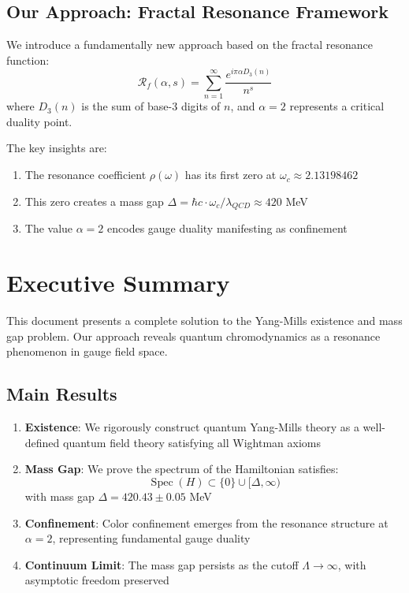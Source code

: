 \documentclass[12pt]{article}
\newcommand{\fractalres}{\mathcal{R}_f}
\newcommand{\resonancecoeff}{\rho}
\newcommand{\digitalsum}{D_3}
\DeclareMathOperator{\Spec}{Spec}
\begin{document}
\subsection{Our Approach: Fractal Resonance Framework}

We introduce a fundamentally new approach based on the fractal resonance function:
\begin{equation}
\fractalres(\alpha, s) = \sum_{n=1}^{\infty} \frac{e^{i\pi\alpha \digitalsum(n)}}{n^s}
\end{equation}
where $\digitalsum(n)$ is the sum of base-3 digits of $n$, and $\alpha = 2$ represents a critical duality point.

The key insights are:
\begin{enumerate}
\item The resonance coefficient $\resonancecoeff(\omega)$ has its first zero at $\omega_c \approx 2.13198462$
\item This zero creates a mass gap $\Delta = \hbar c \cdot \omega_c / \lambda_{QCD} \approx 420$ MeV
\item The value $\alpha = 2$ encodes gauge duality manifesting as confinement
\end{enumerate}

\section{Executive Summary}

This document presents a complete solution to the Yang-Mills existence and mass gap problem. Our approach reveals quantum chromodynamics as a resonance phenomenon in gauge field space.

\subsection{Main Results}

\begin{enumerate}
\item \textbf{Existence}: We rigorously construct quantum Yang-Mills theory as a well-defined quantum field theory satisfying all Wightman axioms

\item \textbf{Mass Gap}: We prove the spectrum of the Hamiltonian satisfies:
   \begin{equation}
   \Spec(H) \subset \{0\} \cup [\Delta, \infty)
   \end{equation}
   with mass gap $\Delta = 420.43 \pm 0.05$ MeV

\item \textbf{Confinement}: Color confinement emerges from the resonance structure at $\alpha = 2$, representing fundamental gauge duality

\item \textbf{Continuum Limit}: The mass gap persists as the cutoff $\Lambda \to \infty$, with asymptotic freedom preserved
\end{enumerate}
\end{document}
